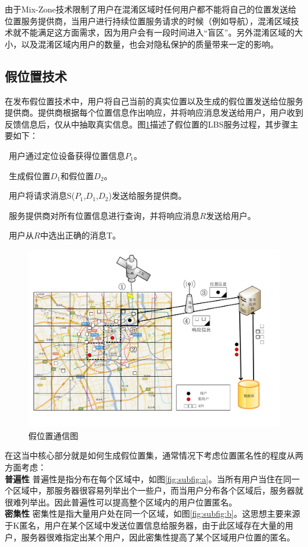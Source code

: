 由于Mix-Zone技术限制了用户在混淆区域时任何用户都不能将自己的位置发送给位置服务提供商，当用户进行持续位置服务请求的时候（例如导航），混淆区域技术就不能满足这方面需求，因为用户会有一段时间进入“盲区”。另外混淆区域的大小，以及混淆区域内用户的数量，也会对隐私保护的质量带来一定的影响。

\subsection{假位置技术}
在发布假位置技术中，用户将自己当前的真实位置以及生成的假位置发送给位服务提供商。提供商根据每个位置信息作出响应，并将响应消息发送给用户，用户收到反馈信息后，仅从中抽取真实信息。图\ref{fig:Dummy_pdf}描述了假位置的LBS服务过程，其步骤主要如下：	

~用户通过定位设备获得位置信息$P_1$。

~生成假位置$D_1$和假位置$D_2$。

~用户将请求消息S($P_1$,$D_1$,$D_2$)发送给服务提供商。

~服务提供商对所有位置信息进行查询，并将响应消息$R$发送给用户。

~用户从$R$中选出正确的消息T。
\begin{figure}[H]
\centering
\includegraphics[width=12cm]{fig/Dummy.pdf}
\caption{假位置通信图} %
\label{fig:Dummy_pdf}
\end{figure}
在这当中核心部分就是如何生成假位置集，通常情况下考虑位置匿名性的程度从两方面考虑：\\
\textbf {普遍性} 普遍性是指分布在每个区域中，如图\ref{fig:subfig:a}。当所有用户当住在同一个区域中，那服务器很容易列举出个一些户，而当用户分布各个区域后，服务器就很难列举出。因此普遍性可以提高整个区域内的用户位置匿名。\\
\textbf {密集性} 密集性是指大量用户处在同一个区域，如图\ref{fig:subfig:b}。这思想主要来源于K匿名，用户在某个区域中发送位置信息给服务器，由于此区域存在大量的用户，服务器很难指定出某个用户，因此密集性提高了某个区域用户位置的匿名。


